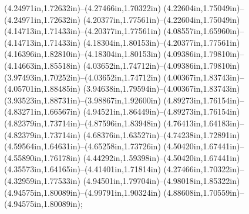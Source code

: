 (4.24971in,1.72632in)--(4.27466in,1.70322in) (4.22604in,1.75049in)--(4.24971in,1.72632in) (4.20377in,1.77561in)--(4.22604in,1.75049in) (4.14713in,1.71433in)--(4.20377in,1.77561in) (4.08557in,1.65960in)--(4.14713in,1.71433in) (4.18304in,1.80153in)--(4.20377in,1.77561in) (4.16396in,1.82810in)--(4.18304in,1.80153in) (4.09386in,1.79810in)--(4.14663in,1.85518in) (4.03652in,1.74712in)--(4.09386in,1.79810in) (3.97493in,1.70252in)--(4.03652in,1.74712in) (4.00367in,1.83743in)--(4.05701in,1.88485in) (3.94638in,1.79594in)--(4.00367in,1.83743in) (3.93523in,1.88731in)--(3.98867in,1.92600in) (4.89273in,1.76154in)--(4.83271in,1.66567in) (4.94521in,1.86449in)--(4.89273in,1.76154in) (4.82379in,1.73714in)--(4.87596in,1.83948in) (4.76413in,1.64183in)--(4.82379in,1.73714in) (4.68376in,1.63527in)--(4.74238in,1.72891in) (4.59564in,1.64631in)--(4.65258in,1.73726in) (4.50420in,1.67441in)--(4.55890in,1.76178in) (4.44292in,1.59398in)--(4.50420in,1.67441in) (4.35573in,1.64165in)--(4.41401in,1.71814in) (4.27466in,1.70322in)--(4.32959in,1.77533in) (4.94501in,1.79704in)--(4.98018in,1.85322in) (4.94575in,1.80089in)--(4.99791in,1.90324in) (4.88608in,1.70559in)--(4.94575in,1.80089in);
